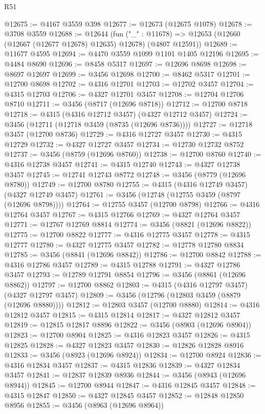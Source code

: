 \begin{lexlean}{R51}
\begin{coremodule}
@12675 := @4167 @3559 @398
@12677 := @12673 (@12675 @1078)
@12678 := @3708 @3559
@12688 := @12644
    (fun ("_" : @11678) => @12653 (@12660 (@12667 (@12677 @12678) @12635) @12678) (@4807 @12591))
@12689 := @11677 @4595
@12694 := @4470 @3559 @1099 @1101 @1405 @12196
@12695 := @4484 @8690
@12696 := @8458 @5317
@12697 := @12696 @8698
@12698 := @8697 @12697
@12699 := @3456 @12698
@12700 := @8462 @5317
@12701 := @12700 @8698
@12702 := @4316 @12701
@12703 := @12702 @3457
@12704 := @4315 @12703
@12706 := @4327 @12701 @3457
@12708 := @12704 @12706 @8710
@12711 := @3456 (@8717 (@12696 @8718))
@12712 := @12700 @8718
@12718 := @4315 (@4316 @12712 @3457) (@4327 @12712 @3457)
@12724 := @3456 (@12711 (@12718 @3459 (@8735 (@12696 @8736))))
@12727 := @12718 @3457 (@12700 @8736)
@12729 := @4316 @12727 @3457
@12730 := @4315 @12729
@12732 := @4327 @12727 @3457
@12734 := @12730 @12732 @8752
@12737 := @3456 (@8759 (@12696 @8760))
@12738 := @12700 @8760
@12740 := @4316 @12738 @3457
@12741 := @4315 @12740
@12743 := @4327 @12738 @3457
@12745 := @12741 @12743 @8772
@12748 := @3456 (@8779 (@12696 @8780))
@12749 := @12700 @8780
@12755 := @4315 (@4316 @12749 @3457) (@4327 @12749 @3457)
@12761 := @3456 (@12748 (@12755 @3459 (@8797 (@12696 @8798))))
@12764 := @12755 @3457 (@12700 @8798)
@12766 := @4316 @12764 @3457
@12767 := @4315 @12766
@12769 := @4327 @12764 @3457
@12771 := @12767 @12769 @8814
@12774 := @3456 (@8821 (@12696 @8822))
@12775 := @12700 @8822
@12777 := @4316 @12775 @3457
@12778 := @4315 @12777
@12780 := @4327 @12775 @3457
@12782 := @12778 @12780 @8834
@12785 := @3456 (@8841 (@12696 @8842))
@12786 := @12700 @8842
@12788 := @4316 @12786 @3457
@12789 := @4315 @12788
@12791 := @4327 @12786 @3457
@12793 := @12789 @12791 @8854
@12796 := @3456 (@8861 (@12696 @8862))
@12797 := @12700 @8862
@12803 := @4315 (@4316 @12797 @3457) (@4327 @12797 @3457)
@12809 := @3456 (@12796 (@12803 @3459 (@8879 (@12696 @8880))))
@12812 := @12803 @3457 (@12700 @8880)
@12814 := @4316 @12812 @3457
@12815 := @4315 @12814
@12817 := @4327 @12812 @3457
@12819 := @12815 @12817 @8896
@12822 := @3456 (@8903 (@12696 @8904))
@12823 := @12700 @8904
@12825 := @4316 @12823 @3457
@12826 := @4315 @12825
@12828 := @4327 @12823 @3457
@12830 := @12826 @12828 @8916
@12833 := @3456 (@8923 (@12696 @8924))
@12834 := @12700 @8924
@12836 := @4316 @12834 @3457
@12837 := @4315 @12836
@12839 := @4327 @12834 @3457
@12841 := @12837 @12839 @8936
@12844 := @3456 (@8943 (@12696 @8944))
@12845 := @12700 @8944
@12847 := @4316 @12845 @3457
@12848 := @4315 @12847
@12850 := @4327 @12845 @3457
@12852 := @12848 @12850 @8956
@12855 := @3456 (@8963 (@12696 @8964))

\end{coremodule}
\end{lexlean}
